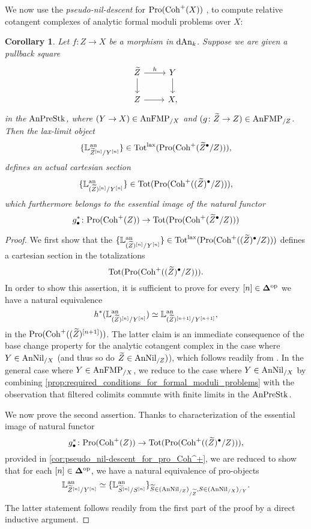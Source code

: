 \documentclass[10pt,a4paper,reqno]{amsart} %
\theoremstyle{plain}
\newtheorem{cor}[thm]{Corollary}
\theoremstyle{definition}
\theoremstyle{remark}
\numberwithin{equation}{section}
\begin{document}
We now use the \emph{pseudo-nil-descent} for $\mathrm{Pro}(\mathrm{Coh}^+(X))$ , to compute relative cotangent complexes of
analytic formal moduli problems over $X$:

\begin{cor} \label{cor:analytic_relative_cotangent_complex_defines_cartesian_sections_in_the_totalization}
    Let $f \colon Z \to X$ be a morphism in $\mathrm{dAn}_k$. Suppose we are given a pullback square
        \[
        \begin{tikzcd}
            \tZ \ar{r}{h} \ar{d} & Y \ar{d} \\
            Z \ar{r} & X,
        \end{tikzcd}
        \]
    in the \infcat $\mathrm{AnPreStk}$, where $( Y \to X) \in \mathrm{AnFMP}_{/X}$ and $(g \colon\widetilde Z \to Z) \in \mathrm{AnFMP}_{/Z}$. Then the lax-limit object
        \[
            \{ \mathbb L^\mathrm{an}_{\widetilde Z^{[n]} / Y^{[n]}} \} \in \mathrm{Tot}^\mathrm{lax}(\mathrm{Pro}(\mathrm{Coh}^+(\widetilde Z^\bullet/Z))),  
        \]
    defines an actual cartesian section
        \[
            \{ \mathbb L^\mathrm{an}_{(\widetilde Z)^{[n]}/ Y^{[n]}} \} \in \mathrm{Tot}(\mathrm{Pro}(\mathrm{Coh}^+((\widetilde Z)^\bullet /Z))),
        \]
    which furthermore belongs to the essential image of the natural functor
        \[
            g^*_\bullet \colon \mathrm{Pro}(\mathrm{Coh}^+(Z)) \to \mathrm{Tot}(\mathrm{Pro}(\mathrm{Coh}^+(\widetilde Z^\bullet / Z)))
        \]
\end{cor}

\begin{proof}
    We first show that the $\{ \mathbb L^\mathrm{an}_{(\widetilde Z)^{[n]}/ Y^{[n]}} \}  \in \mathrm{Tot}^\mathrm{lax}(\mathrm{Pro}(\mathrm{Coh}^+((\widetilde Z)^\bullet/ Z)))$
    defines a cartesian section in the totalizations
        \[
            \mathrm{Tot}(\mathrm{Pro}(\mathrm{Coh}^+((\widetilde Z)^\bullet / Z))).  
        \]
    In order to show this assertion, it is sufficient to prove for every $[n ] \in \bm{\Delta} ^\mathrm{op}$ we have a natural equivalence
        \[
            h^*(\mathbb L^\mathrm{an}_{(\widetilde Z)^{[n]} / Y^{[n]}}) \simeq \mathbb L^\mathrm{an}_{(\widetilde Z)^{[n+1]}/ Y^{[n+1]}},  
        \]
    in the \infcat $\mathrm{Pro}(\mathrm{Coh}^+((\widetilde Z)^{[n+1]}))$. The latter claim is an immediate consequence of the base change property for the analytic
    cotangent complex in the case where $Y \in \mathrm{AnNil}_{/X}$ (and thus so do $\widetilde Z \in \mathrm{AnNil}_{/Z})$), which follows readily from
    \cite[Proposition 5.12]{Porta_Yu_Representability}. In the general case where $Y \in \mathrm{AnFMP}_{/X}$, we reduce to the case
    where $Y \in \mathrm{AnNil}_{/X}$ by combining \cref{prop:required_conditions_for_formal_moduli_problems} with the observation that filtered colimits
    commute with finite limits in the \infcat $\mathrm{AnPreStk}$. 

    We now prove the second assertion. Thanks to characterization of the essential image of natural functor
        \[
            g^*_{\bullet} \colon \mathrm{Pro}(\mathrm{Coh}^+(Z)) \to \mathrm{Tot}(\mathrm{Pro}(\mathrm{Coh}^+((\widetilde Z)^\bullet /Z))),  
        \]
    provided in \cref{cor:pseudo_nil-descent_for_pro_Coh^+}, we are reduced to show that for each $[n] \in \bm{\Delta} ^\mathrm{op}$, we have a natural
    equivalence of pro-objects
        \[
            \mathbb L^\mathrm{an}_{\widetilde Z^{[n]} / Y^{[n]}} \simeq \{ \mathbb L^\mathrm{an}_{\widetilde S^{[n]}/ S^{[n]}} \}_{\widetilde S \in (\mathrm{AnNil}_{/ Z})_{/\widetilde Z}, S \in (\mathrm{AnNil}_{/X})_{/ Y}}.
        \]
    The latter statement follows readily from the first part of the proof by a direct inductive argument.
\end{proof}
\end{document}
